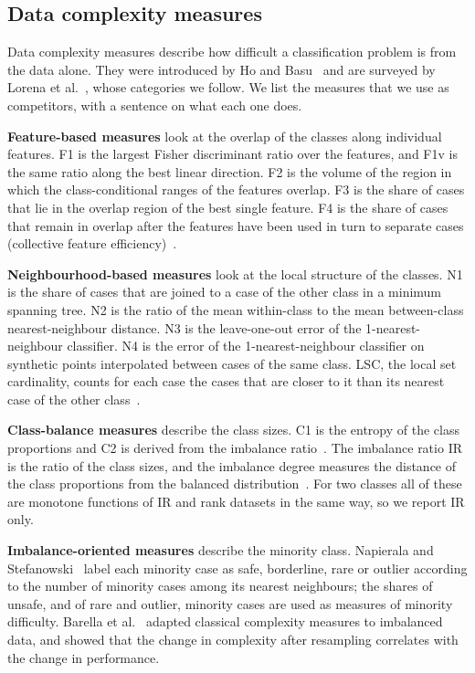 \documentclass[preprint,12pt]{elsarticle}
\newcommand{\IR}{\mathrm{IR}}
\begin{document}
\subsection{Data complexity measures}
Data complexity measures describe how difficult a classification problem is from the data alone. They were introduced by Ho and Basu~\cite{Ho2002} and are surveyed by Lorena et al.~\cite{Lorena2019}, whose categories we follow. We list the measures that we use as competitors, with a sentence on what each one does.

\textbf{Feature-based measures} look at the overlap of the classes along individual features. F1 is the largest Fisher discriminant ratio over the features, and F1v is the same ratio along the best linear direction. F2 is the volume of the region in which the class-conditional ranges of the features overlap. F3 is the share of cases that lie in the overlap region of the best single feature. F4 is the share of cases that remain in overlap after the features have been used in turn to separate cases (collective feature efficiency)~\cite{Ho2002,Lorena2019}.

\textbf{Neighbourhood-based measures} look at the local structure of the classes. N1 is the share of cases that are joined to a case of the other class in a minimum spanning tree. N2 is the ratio of the mean within-class to the mean between-class nearest-neighbour distance. N3 is the leave-one-out error of the 1-nearest-neighbour classifier. N4 is the error of the 1-nearest-neighbour classifier on synthetic points interpolated between cases of the same class. LSC, the local set cardinality, counts for each case the cases that are closer to it than its nearest case of the other class~\cite{Ho2002,Lorena2019,Leyva2015}.

\textbf{Class-balance measures} describe the class sizes. C1 is the entropy of the class proportions and C2 is derived from the imbalance ratio~\cite{Lorena2019}. The imbalance ratio $\IR$ is the ratio of the class sizes, and the imbalance degree measures the distance of the class proportions from the balanced distribution~\cite{Ortigosa2017}. For two classes all of these are monotone functions of $\IR$ and rank datasets in the same way, so we report $\IR$ only.

\textbf{Imbalance-oriented measures} describe the minority class. Napierala and Stefanowski~\cite{Napierala2016} label each minority case as safe, borderline, rare or outlier according to the number of minority cases among its nearest neighbours; the shares of unsafe, and of rare and outlier, minority cases are used as measures of minority difficulty. Barella et al.~\cite{Barella2021} adapted classical complexity measures to imbalanced data, and showed that the change in complexity after resampling correlates with the change in performance.
\end{document}
